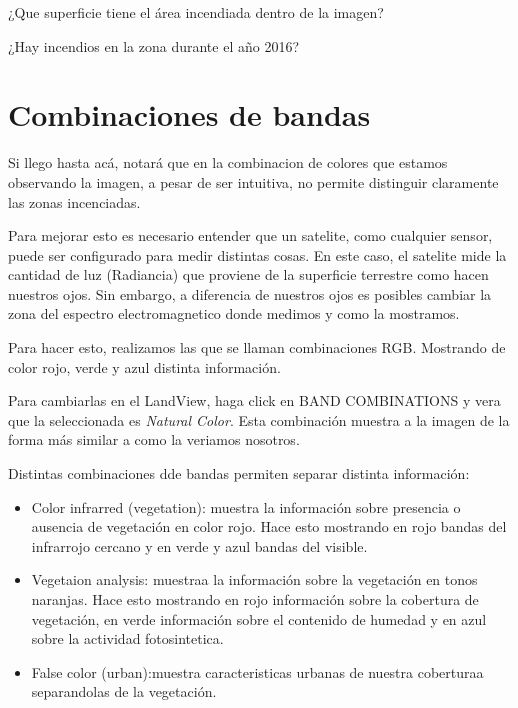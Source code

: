 \documentclass[a4paper,10pt]{article}
\begin{document}
\begin{que}
    ¿Que superficie tiene el área incendiada dentro de la imagen?
\end{que}

\begin{que}
    ¿Hay incendios en la zona durante el año 2016?
\end{que}

\section{Combinaciones de bandas}
Si llego hasta acá, notará que en la combinacion de colores que estamos observando la imagen, a pesar de ser intuitiva, no permite distinguir claramente las zonas incenciadas.

Para mejorar esto es necesario entender que un satelite, como cualquier sensor, puede ser configurado para medir distintas cosas. En este caso, el satelite mide la cantidad de luz (Radiancia) que proviene de la superficie terrestre como hacen nuestros ojos. Sin embargo, a diferencia de nuestros ojos es posibles cambiar la zona del espectro electromagnetico donde medimos y como la mostramos.

Para hacer esto, realizamos las que se llaman combinaciones RGB. Mostrando de color rojo, verde y azul distinta información.

Para cambiarlas en el LandView, haga click en BAND COMBINATIONS y vera que la seleccionada es \emph{Natural Color}. Esta combinación muestra a la imagen de la forma más similar a como la veriamos nosotros.

Distintas combinaciones dde bandas permiten separar distinta información:

\begin{itemize}
    \item Color infrarred (vegetation): muestra la información sobre presencia o ausencia de vegetación en color rojo. Hace esto mostrando en rojo bandas del infrarrojo cercano y en verde y azul bandas del visible.
    \item Vegetaion analysis: muestraa la información sobre la vegetación en tonos naranjas. Hace esto mostrando en rojo información sobre la cobertura de vegetación, en verde información sobre el contenido de humedad y en azul sobre la actividad fotosintetica.
    \item False color (urban):muestra caracteristicas urbanas de nuestra coberturaa separandolas de la vegetación.
\end{itemize}
\end{document}
